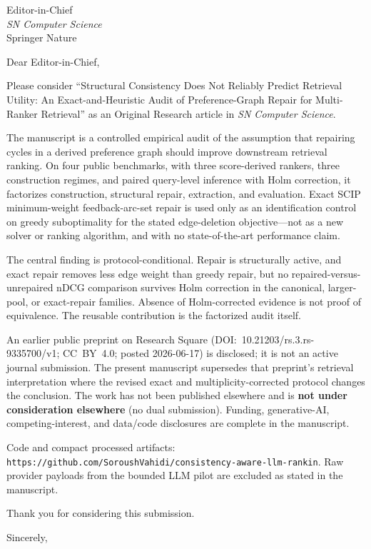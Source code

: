 \documentclass[10pt]{letter}
\begin{document}
\begin{letter}{Editor-in-Chief\\
\textit{SN Computer Science}\\
Springer Nature}

\opening{Dear Editor-in-Chief,}

Please consider ``Structural Consistency Does Not Reliably Predict Retrieval
Utility: An Exact-and-Heuristic Audit of Preference-Graph Repair for
Multi-Ranker Retrieval'' as an Original Research article in
\textit{SN Computer Science}.

The manuscript is a controlled empirical audit of the assumption that repairing
cycles in a derived preference graph should improve downstream retrieval
ranking. On four public benchmarks, with three score-derived rankers, three
construction regimes, and paired query-level inference with Holm correction, it
factorizes construction, structural repair, extraction, and evaluation. Exact
SCIP minimum-weight feedback-arc-set repair is used only as an identification
control on greedy suboptimality for the stated edge-deletion objective---not as
a new solver or ranking algorithm, and with no state-of-the-art performance claim.

The central finding is protocol-conditional. Repair is structurally active, and
exact repair removes less edge weight than greedy repair, but no
repaired-versus-unrepaired nDCG comparison survives Holm correction in the
canonical, larger-pool, or exact-repair families. Absence of Holm-corrected
evidence is not proof of equivalence. The reusable contribution is the
factorized audit itself.

An earlier public preprint on Research Square
(DOI:~10.21203/rs.3.rs-9335700/v1; CC~BY~4.0; posted 2026-06-17) is disclosed;
it is not an active journal submission. The present manuscript supersedes that
preprint's retrieval interpretation where the revised exact and
multiplicity-corrected protocol changes the conclusion. The work has not been
published elsewhere and is \textbf{not under consideration elsewhere} (no dual
submission). Funding, generative-AI, competing-interest, and data/code
disclosures are complete in the manuscript.

Code and compact processed artifacts:
\texttt{https://github.com/SoroushVahidi/consistency-aware-llm-rankin}.
Raw provider payloads from the bounded LLM pilot are excluded as stated in the
manuscript.

Thank you for considering this submission.

\closing{Sincerely,}

\end{letter}
\end{document}
